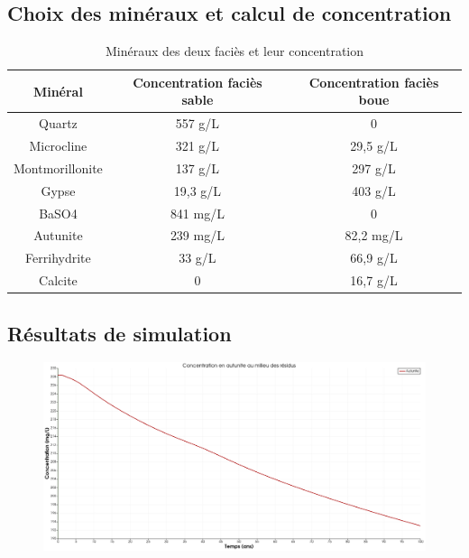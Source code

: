 \documentclass{article}
\begin{document}
\subsection{Choix des minéraux et calcul de concentration}
\begin{table}[H]
    \centering    
    \caption{Minéraux des deux faciès et leur concentration }
    \begin{tabular}{ |c |c |c |}
        \hline
         \textbf{Minéral} & \textbf{Concentration faciès sable} & \textbf{Concentration faciès boue}\\ 
         \hline
         Quartz & 557 g/L & 0 \\ 
         \hline
         Microcline & 321 g/L & 29,5 g/L  \\
         \hline
         Montmorillonite & 137 g/L & 297 g/L  \\
         \hline
         Gypse & 19,3 g/L & 403 g/L  \\
         \hline
         BaSO4 & 841 mg/L & 0  \\
          \hline
         Autunite & 239 mg/L & 82,2 mg/L  \\
          \hline
         Ferrihydrite & 33 g/L & 66,9 g/L  \\
          \hline
         Calcite & 0 & 16,7 g/L \\
         \hline
    \end{tabular}

    \label{tab:mineraux_concentrations}
\end{table}

\subsection{Résultats de simulation}

\begin{figure}[H]
    \centering
    \includegraphics[width=0.5\linewidth]{III_B_2_2.png}
    \caption{}
    \label{fig:annexe_autunite_residus_sable_base}
\end{figure}
\end{document}
